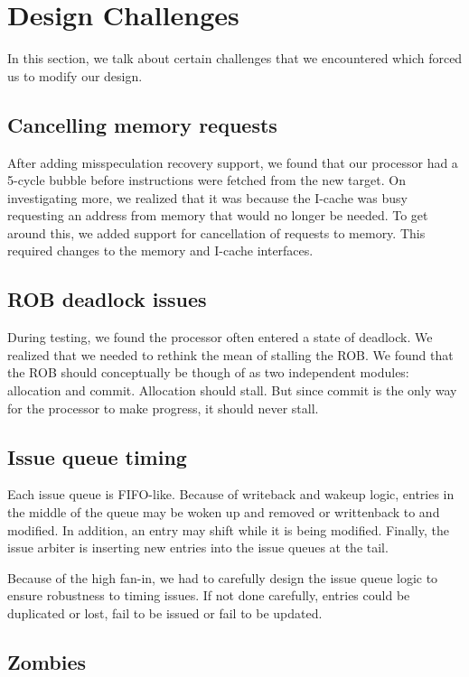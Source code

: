 \documentclass{article}
\begin{document}
\section{Design Challenges}
\label{sec:design-chal}
In this section, we talk about certain challenges that we encountered which
forced us to modify our design.

\subsection{Cancelling memory requests}

After adding misspeculation recovery support, we found that our processor had a
5-cycle bubble before instructions were fetched from the new target. On
investigating more, we realized that it was because the I-cache was busy
requesting an address from memory that would no longer be needed.  To get around
this, we added support for cancellation of requests to memory. This required
changes to the memory and I-cache interfaces.

\subsection{ROB deadlock issues}

During testing, we found the processor often entered a state of deadlock. We
realized that we needed to rethink the mean of stalling the ROB. We found that
the ROB should conceptually be though of as two independent modules: allocation
and commit. Allocation should stall. But since commit is the only way for the
processor to make progress, it should never stall.

\subsection{Issue queue timing}

Each issue queue is FIFO-like. Because of writeback and wakeup logic, entries in
the middle of the queue may be woken up and removed or writtenback to and
modified. In addition, an entry may shift while it is being modified. Finally,
the issue arbiter is inserting new entries into the issue queues at the tail.

Because of the high fan-in, we had to carefully design the issue queue logic to
ensure robustness to timing issues. If not done carefully, entries could be
duplicated or lost, fail to be issued or fail to be updated.

\subsection{Zombies}
\end{document}
